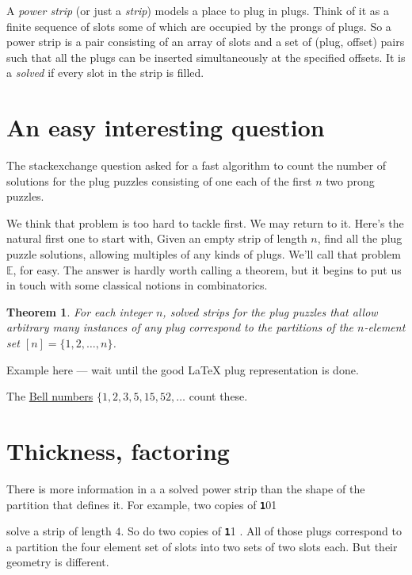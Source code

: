 \documentclass[10pt]{article}
\newtheorem{theorem}{Theorem}
\numberwithin{equation}{section}
\newenvironment{anote}
               {{\textcolor{blue}{Note:}}
                 \itshape
               }
               {}
\newcommand{\plug}[1]{%
\mbox{{\textbf\texttt #1}}
}
\begin{document}
 
 A \emph{power strip} (or just a \emph{strip}) models a place to plug
 in plugs. Think of it as a finite sequence of slots some of
 which are occupied by the prongs of plugs. So a power strip
is a pair consisting of an array of slots and a set of (plug, offset)
pairs such that all the plugs can be inserted simultaneously at
 the specified offsets. It is a \emph{solved} if
 every slot in the strip is filled.

 \section{An easy interesting question}

 The stackexchange question asked for a fast algorithm to count the
 number of solutions for the plug puzzles consisting of one each of
 the first $n$ two prong puzzles.
 
We think that problem is too  hard to tackle first. We may return to
it.  Here's the natural first one to start with, Given an empty strip
of length $n$, find all the plug puzzle solutions, allowing multiples
of any kinds of plugs. We'll call that problem $\mathbb{E}$, for easy.
The answer is hardly worth calling a
theorem, but it begins to put us in touch with some classical notions
in combinatorics.

\begin{theorem} For each integer $n$, solved strips for the plug
  puzzles that allow arbitrary many instances of any plug
correspond to the partitions of the   $n$-element set $[n] = \{1,2,
\ldots, n \}$. 
\end{theorem}

\begin{anote}
Example here --- wait until the good \LaTeX{} plug representation
  is done.
\end{anote}

The \href{https://en.wikipedia.org/wiki/Bell_number}{Bell numbers}
$\{1, 2, 3, 5, 15, 52, \ldots$  count these.

\section{Thickness, factoring}

There is more information in a a solved power strip than the shape of
the partition that defines it. For example, two copies of \plug{101}
solve a strip of length $4$. So do two copies of \plug{11}. All of
those plugs correspond to a partition the four element set of slots
into two sets of two slots each. But their geometry is different.
\end{document}
